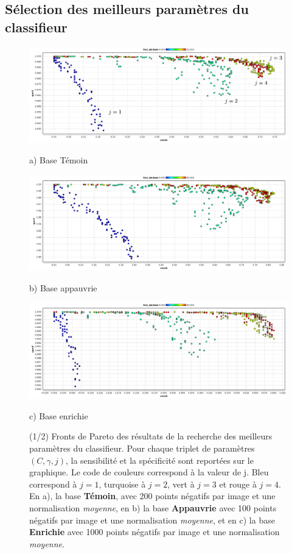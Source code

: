 \subsection{Sélection des meilleurs paramètres du classifieur}
\begin{figure}[h!]
\begin{center}
 \includegraphics[width=14cm]{images/pareto_param_200}

{\small a) Base Témoin}
\vspace{0.5cm}

\includegraphics[width=14cm]{images/pareto_param_100.png}

{\small b) Base appauvrie}

 \includegraphics[width=14cm]{images/pareto_param_1000.png}
 
{\small c) Base enrichie}

\end{center}
 \caption[(1/2) Recherche des meilleurs paramètres du classifieurs : Fronts de pareto]{(1/2) Fronts de Pareto des résultats de la recherche des meilleurs paramètres du classifieur. Pour chaque triplet de paramètres $(C, \gamma, j)$, la sensibilité et la spécificité sont reportées sur le graphique. Le code de couleurs correspond à la valeur de j. Bleu correspond à $j=1$, turquoise à $j=2$, vert à $j=3$ et rouge à $j=4$. En a), la base \textbf{Témoin}, avec 200 points négatifs par image et une normalisation \emph{moyenne}, en b) la base \textbf{Appauvrie} avec 100 points négatifs par image et une normalisation \emph{moyenne}, et en c) la base \textbf{Enrichie} avec 1000 points négatifs par image et une normalisation \emph{moyenne}.}
\label{fig:paretoParams1}
\end{figure}



